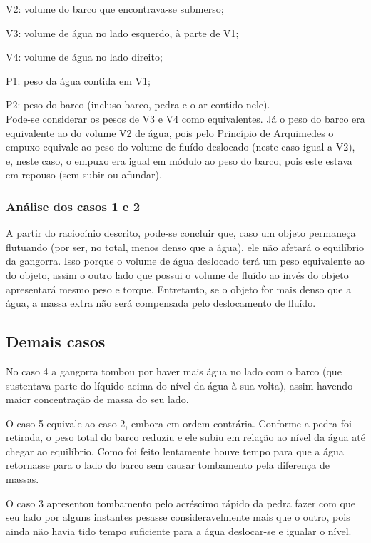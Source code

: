 V2: volume do barco que encontrava-se submerso;

V3: volume de água no lado esquerdo, à parte de V1;

V4: volume de água no lado direito;

P1: peso da água contida em V1;

P2: peso do barco (incluso barco, pedra e o ar contido nele).
\\

Pode-se considerar os pesos de V3 e V4 como equivalentes. Já o peso do barco era equivalente ao do volume V2 de água, pois pelo Princípio de Arquimedes o empuxo equivale ao peso do volume de fluído deslocado (neste caso igual a V2), e, neste caso, o empuxo era igual em módulo ao peso do barco, pois este estava em repouso (sem subir ou afundar).

\subsubsection{Análise dos casos 1 e 2}
A partir do raciocínio descrito, pode-se concluir que, caso um objeto permaneça flutuando (por ser, no total, menos denso que a água), ele não afetará o equilíbrio da gangorra. Isso porque o volume de água deslocado terá um peso equivalente ao do objeto, assim o outro lado que possui o volume de fluído ao invés do objeto apresentará mesmo peso e torque. Entretanto, se o objeto for mais denso que a água, a massa extra não será compensada pelo deslocamento de fluído.

\subsection{Demais casos}
No caso 4 a gangorra tombou por haver mais água no lado com o barco (que sustentava parte do líquido acima do nível da água à sua volta), assim havendo maior concentração de massa do seu lado.

O caso 5 equivale ao caso 2, embora em ordem contrária. Conforme a pedra foi retirada, o peso total do barco reduziu e ele subiu em relação ao nível da água até chegar ao equilíbrio. Como foi feito lentamente houve tempo para que a água retornasse para o lado do barco sem causar tombamento pela diferença de massas.

O caso 3 apresentou tombamento pelo acréscimo rápido da pedra fazer com que seu lado por alguns instantes pesasse consideravelmente mais que o outro, pois ainda não havia tido tempo suficiente para a água deslocar-se e igualar o nível.

